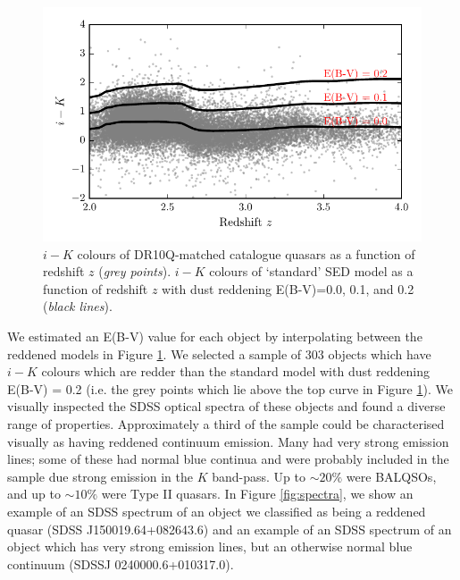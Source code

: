\begin{figure}
  \centering
  \includegraphics[width=\textwidth]{figures/chapter06/ik_versus_z_high_ext.pdf}
  \caption{$i-K$ colours of DR10Q-matched catalogue quasars as a function of redshift $z$ ({\it grey points}). $i - K$ colours of `standard' SED model as a function of redshift $z$ with dust reddening E(B-V)=0.0, 0.1, and 0.2 ({\it black lines}).}
  \label{fig:ikvz}
\end{figure}

We estimated an E(B-V) value for each object by interpolating between the reddened models in Figure \ref{fig:ikvz}. 
We selected a sample of 303 objects which have $i-K$ colours which are redder than the standard model with dust reddening E(B-V) = 0.2 (i.e. the grey points which lie above the top curve in Figure \ref{fig:ikvz}). 
We visually inspected the SDSS optical spectra of these objects and found a diverse range of properties. Approximately a third of the sample could be characterised visually as having reddened continuum emission. 
Many had very strong emission lines; some of these had normal blue continua and were probably included in the sample due strong \ha emission in the $K$ band-pass. 
Up to $\sim 20\%$ were BALQSOs, and up to $\sim 10\%$ were Type II quasars. 
In Figure \ref{fig:spectra}, we show an example of an SDSS spectrum of an object we classified as being a reddened quasar (SDSS J150019.64+082643.6) and an example of an SDSS spectrum of an object which has very strong emission lines, but an otherwise normal blue continuum (SDSSJ 0240000.6+010317.0).  

